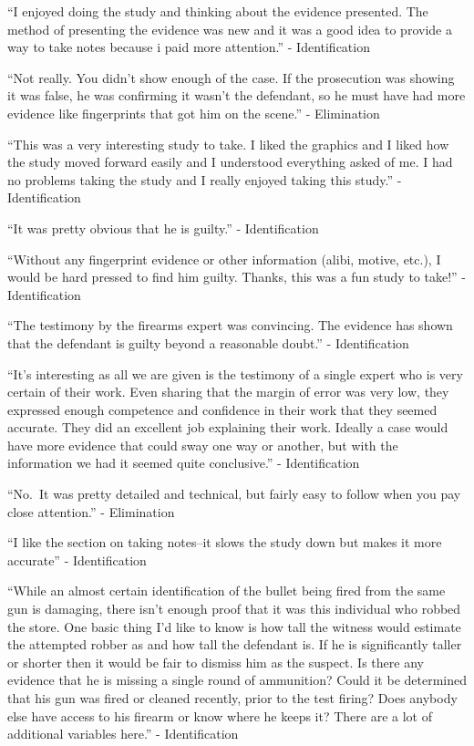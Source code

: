 \documentclass[print]{nuthesis}
\begin{document}
``I enjoyed doing the study and thinking about the evidence presented. The method of presenting the evidence was new and it was a good idea to provide a way to take notes because i paid more attention.'' - Identification

``Not really. You didn't show enough of the case. If the prosecution was showing it was false, he was confirming it wasn't the defendant, so he must have had more evidence like fingerprints that got him on the scene.'' - Elimination

``This was a very interesting study to take. I liked the graphics and I liked how the study moved forward easily and I understood everything asked of me. I had no problems taking the study and I really enjoyed taking this study.'' - Identification

``It was pretty obvious that he is guilty.'' - Identification

``Without any fingerprint evidence or other information (alibi, motive, etc.), I would be hard pressed to find him guilty. Thanks, this was a fun study to take!'' - Identification

``The testimony by the firearms expert was convincing. The evidence has shown that the defendant is guilty beyond a reasonable doubt.'' - Identification

``It's interesting as all we are given is the testimony of a single expert who is very certain of their work. Even sharing that the margin of error was very low, they expressed enough competence and confidence in their work that they seemed accurate. They did an excellent job explaining their work. Ideally a case would have more evidence that could sway one way or another, but with the information we had it seemed quite conclusive.'' - Identification

``No.~It was pretty detailed and technical, but fairly easy to follow when you pay close attention.'' - Elimination

``I like the section on taking notes--it slows the study down but makes it more accurate'' - Identification

``While an almost certain identification of the bullet being fired from the same gun is damaging, there isn't enough proof that it was this individual who robbed the store. One basic thing I'd like to know is how tall the witness would estimate the attempted robber as and how tall the defendant is. If he is significantly taller or shorter then it would be fair to dismiss him as the suspect. Is there any evidence that he is missing a single round of ammunition? Could it be determined that his gun was fired or cleaned recently, prior to the test firing? Does anybody else have access to his firearm or know where he keeps it? There are a lot of additional variables here.'' - Identification
\end{document}

